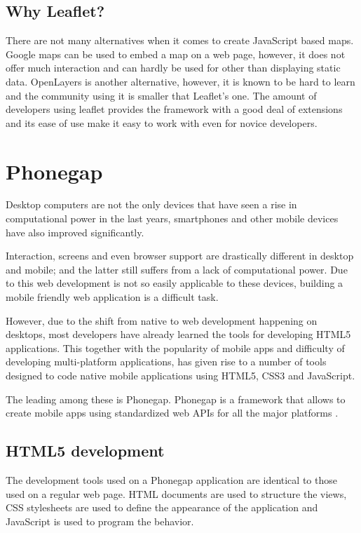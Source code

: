 \subsection*{Why Leaflet?}

There are not many alternatives when it comes to create JavaScript based maps. Google maps can be used to embed a map on a web page, however, it does not offer much interaction and can hardly be used for other than displaying static data. OpenLayers is another alternative, however, it is known to be hard to learn and the community using it is smaller that Leaflet's one. The amount of developers using leaflet provides the framework with a good deal of extensions and its ease of use make it easy to work with even for novice developers.

\section{Phonegap}\label{sec:phonegap}

Desktop computers are not the only devices that have seen a rise in computational power in the last years, smartphones and other mobile devices have also improved significantly. 

Interaction, screens and even browser support are drastically different in desktop and mobile; and the latter still suffers from a lack of computational power. Due to this web development is not so easily applicable to these devices, building a mobile friendly web application is a difficult task.

However, due to the shift from native to web development happening on desktops, most developers have already learned the tools for developing HTML5 applications. This together with the popularity of mobile apps and difficulty of developing multi-platform applications, has given rise to a number of tools designed to code native mobile applications using HTML5, CSS3 and JavaScript.

The leading among these is Phonegap. Phonegap is a framework that allows to create mobile apps using standardized web APIs for all the major platforms \cite{phonegap}. 

\subsection*{HTML5 development}

The development tools used on a Phonegap application are identical to those used on a regular web page. HTML documents are used to structure the views, CSS stylesheets are used to define the appearance of the application and JavaScript is used to program the behavior.

